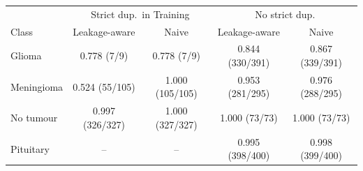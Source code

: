 \begin{tabular}{lcccc}
\toprule
 & \multicolumn{2}{c}{Strict dup.\ in Training} & \multicolumn{2}{c}{No strict dup.} \\
Class & Leakage-aware & Naive & Leakage-aware & Naive \\
\midrule
Glioma & 0.778 (7/9) & 0.778 (7/9) & 0.844 (330/391) & 0.867 (339/391) \\
Meningioma & 0.524 (55/105) & 1.000 (105/105) & 0.953 (281/295) & 0.976 (288/295) \\
No tumour & 0.997 (326/327) & 1.000 (327/327) & 1.000 (73/73) & 1.000 (73/73) \\
Pituitary & -- & -- & 0.995 (398/400) & 0.998 (399/400) \\
\bottomrule
\end{tabular}